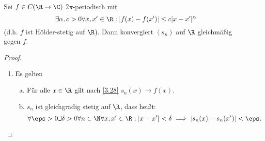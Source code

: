 \begin{st} \label{3.30}
	Sei $f \in C(\R \to \C)$ $2\pi$-periodisch mit
	\[
		\exists \alpha, c > 0 \forall x, x' \in \R : |f(x) - f(x')| \le c | x -x'|^\alpha
	\]
	(d.h. $f$ ist Hölder-stetig auf $\R$).
	Dann konvergiert $(s_n)$ auf $\R$ gleichmäßig gegen $f$.
	\begin{proof}
		\begin{enumerate}[1)]
			\item
				Es gelten
				\begin{enumerate}[a)]
					\item
						Für alle $x\in \R$ gilt nach \ref{3.28} $s_n(x) \to f(x)$.
					\item
						$s_n$ ist gleichgradig stetig auf $\R$, dass heißt:
						\[
							\forall \eps > 0 \exists \delta > 0 \forall n \in \N \forall x,x' \in \R : |x-x'|< \delta \implies |s_n(x)-s_n(x')| < \eps.
						\]


\end{enumerate}
\end{enumerate}
\end{proof}
\end{st}
